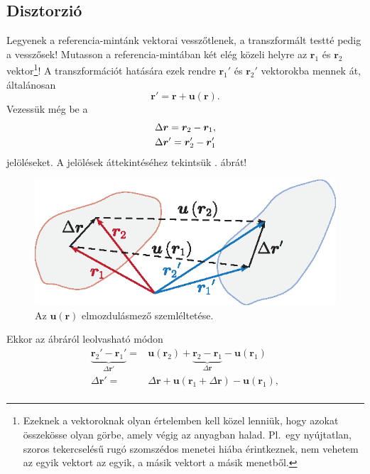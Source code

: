 \documentclass[12pt,a4paper]{scrartcl}
\let\mathbf\bm
\begin{document}
\subsection{Disztorzió}
Legyenek a referencia-mintánk vektorai vesszőtlenek, a transzformált testté pedig a vesszősek! Mutasson a referencia-mintában két elég közeli helyre az ${{\mathbf{r}}_1}$ és ${{\mathbf{r}}_2}$ vektor\footnote{Ezeknek a vektoroknak olyan értelemben kell közel lenniük, hogy azokat összekösse olyan görbe, amely végig az anyagban halad. Pl.\ egy nyújtatlan, szoros tekercselésű rugó szomszédos menetei hiába érintkeznek, nem vehetem az egyik vektort az egyik, a másik vektort a másik menetből.}! A transzformációt hatására ezek rendre ${\mathbf{r}}_1'$ és ${\mathbf{r}}_2'$ vektorokba mennek át, általánosan \[{\mathbf{r}}' = {\mathbf{r}} + {\mathbf{u}}\left( {\mathbf{r}} \right).\]
Vezessük még be a \[\begin{gathered}
  \Delta {\mathbf{r}} = {{\mathbf{r}}_2} - {{\mathbf{r}}_1}, \hfill \\
  \Delta {\mathbf{r}}' = {{\mathbf{r}}_2'} - {{\mathbf{r}}_1'} \hfill \\ 
\end{gathered} \]
jelöléseket. A jelölések áttekintéséhez tekintsük . ábrát!
\begin{figure}[htb] 
\centering    
\includegraphics[scale=1]{figs/u.eps}
\caption{Az ${\mathbf{u}}\left( {\mathbf{r}} \right)$ elmozdulásmező szemléltetése.}
\label{fig:u}
\end{figure}
Ekkor az ábráról leolvasható módon
\[\begin{aligned}
  \underbrace {{{\mathbf{r}}_2}' - {{\mathbf{r}}_1}'}_{\Delta {\mathbf{r}}'} =  & {\mathbf{u}}\left( {{{\mathbf{r}}_2}} \right) + \underbrace {{{\mathbf{r}}_2} - {{\mathbf{r}}_1}}_{\Delta {\mathbf{r}}} - {\mathbf{u}}\left( {{{\mathbf{r}}_1}} \right) \\ 
  \Delta {\mathbf{r}}' =  & \Delta {\mathbf{r}} + {\mathbf{u}}\left( {{{\mathbf{r}}_1} + \Delta {\mathbf{r}}} \right) - {\mathbf{u}}\left( {{{\mathbf{r}}_1}} \right), \\ 
\end{aligned} \]
\end{document}
